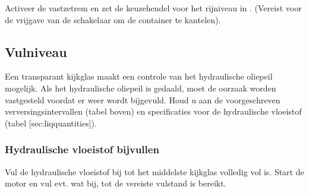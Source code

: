 \item Activeer de vastzetrem en zet de keuzehendel voor het rijniveau in . (Vereist voor de vrijgave van de schakelaar om de container te kantelen).



\subsection[niveau_hydrau]{Vulniveau}

Een transparant kijkglas maakt een controle van het hydraulische oliepeil mogelijk.
Als het hydraulische oliepeil is gedaald, moet de oorzaak worden vastgesteld voordat er weer wordt bijgevuld. Houd u aan de voorgeschreven verversingsintervallen (tabel boven) en specificaties voor de hydraulische vloeistof (tabel [sec:liqquantities]).


\subsubsection{Hydraulische vloeistof bijvullen}

Vul de hydraulische vloeistof bij tot het middelste kijkglas volledig vol is.
Start de motor en vul evt. wat bij, tot de vereiste vulstand is bereikt.
